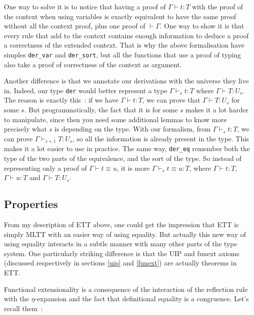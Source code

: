 One way to solve it is to notice that having a proof of $\Gamma\vdash t : T$
with the proof of the context when using variables is exactly equivalent to
have the same proof without all the context proof, plus one proof of
$\vdash\Gamma$. One way to show it is that every rule that add to the context
contains enough information to deduce a proof a correctness of the extended
context. That is why the above formalisation have simples \texttt{der\_var} and
\texttt{der\_sort}, but all the functions that use a proof of typing also take
a proof of correctness of the context as argument.

Another difference is that we annotate our derivations with the universe they
live in. Indeed, our type \texttt{der} would better represent a type
$\Gamma\vdash_{s} t : T$ where $\Gamma\vdash T : U_{s}$. The reason is exactly this~: if we have
$\Gamma\vdash t : T$, we can prove that $\Gamma\vdash T : U_{s}$ for some $s$. But programmatically,
the fact that it is for some $s$ makes it a lot harder to manipulate, since then
you need some additional lemmas to know more precisely what $s$ is depending on
the type.  With our formalism, from $\Gamma\vdash_{s} t : T$, we can prove
$\Gamma\vdash_{s+1} T : U_{s}$, so all the information is already present in the type.
This makes it a lot easier to use in practice. The same way, \texttt{der\_eq}
remember both the type of the two parts of the equivalence, and the sort of the
type. So instead of representing only a proof of $\Gamma\vdash t \equiv u$, it is more
$\Gamma\vdash_{s} t \equiv u : T$, where $\Gamma\vdash t : T$, $\Gamma\vdash u : T$ and $\Gamma\vdash T : U_{s}$.

\subsection{Properties}\label{ETT-prop}

From my description of ETT above, one could get the impression that ETT is
simply MLTT with an easier way of using equality. But actually this new way of
using equality interacts in a subtle manner with many other parts of the type
system. One particularly striking difference is that the UIP and funext axioms
(discussed respectively in sections \ref{uip} and \ref{funext}) are actually
theorems in ETT.

Functional extensionality is a consequence of the interaction of the reflection
rule with the $\eta$-expansion and the fact that definitional equality is a
congruence. Let's recall them~:


